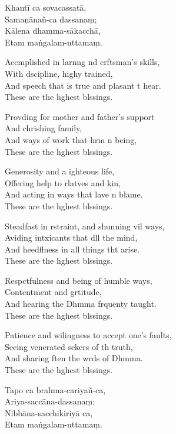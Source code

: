 Khantī ca sovacassatā,\\
Samaṇānañ-ca dassanaṃ;\\
Kālena dhamma-sākacchā,\\
Etam maṅgalam-uttamaṃ.

\clearpage

Accmplished in larnng nd crftsman's skills,\\%
With dscipline, highy trained,\\
And speech that is true and plasant t hear.\\
These are the hghest blssings.

Provding for mother and father's support\\
And chrishing family,\\
And ways of work that hrm n being,\\
These are the hghest blssings.

Generosity and a ighteous life,\\
Offering help to rlatves and kin,\\
And acting in ways that lave n blame.\\
These are the hghest blssings.

Steadfast in rstraint, and shunning vil ways,\\
Aviding intxicants that dll the mind,\\
And heedflness in all things tht arise.\\
These are the hghest blssings.

Respctfulness and being of humble ways,\\
Contentment and grtitude,\\
And hearing the Dhmma frquenty taught.\\
These are the hghest blssings.

Patience and wilingness to accept one's faults,\\
Seeing venerated sekers of th truth,\\
And sharing ften the wrds of Dhmma.\\
These are the hghest blssings.

\clearpage

Tapo ca brahma-cariyañ-ca,\\%
Ariya-saccāna-dassanaṃ;\\
Nibbāna-sacchikiriyā ca,\\
Etam maṅgalam-uttamaṃ.

